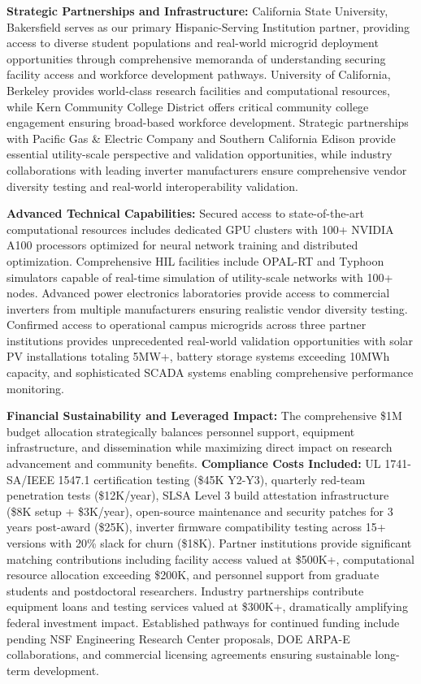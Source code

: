\documentclass[12pt]{article}
\begin{document}
\textbf{Strategic Partnerships and Infrastructure:} California State University, Bakersfield serves as our primary Hispanic-Serving Institution partner, providing access to diverse student populations and real-world microgrid deployment opportunities through comprehensive memoranda of understanding securing facility access and workforce development pathways. University of California, Berkeley provides world-class research facilities and computational resources, while Kern Community College District offers critical community college engagement ensuring broad-based workforce development. Strategic partnerships with Pacific Gas \& Electric Company and Southern California Edison provide essential utility-scale perspective and validation opportunities, while industry collaborations with leading inverter manufacturers ensure comprehensive vendor diversity testing and real-world interoperability validation.

\textbf{Advanced Technical Capabilities:} Secured access to state-of-the-art computational resources includes dedicated GPU clusters with 100+ NVIDIA A100 processors optimized for neural network training and distributed optimization. Comprehensive HIL facilities include OPAL-RT and Typhoon simulators capable of real-time simulation of utility-scale networks with 100+ nodes. Advanced power electronics laboratories provide access to commercial inverters from multiple manufacturers ensuring realistic vendor diversity testing. Confirmed access to operational campus microgrids across three partner institutions provides unprecedented real-world validation opportunities with solar PV installations totaling 5MW+, battery storage systems exceeding 10MWh capacity, and sophisticated SCADA systems enabling comprehensive performance monitoring.

\textbf{Financial Sustainability and Leveraged Impact:} The comprehensive \$1M budget allocation \cite{nrel2021} strategically balances personnel support, equipment infrastructure, and dissemination while maximizing direct impact on research advancement and community benefits. \textbf{Compliance Costs Included:} UL 1741-SA/IEEE 1547.1 certification testing (\$45K Y2-Y3), quarterly red-team penetration tests (\$12K/year), SLSA Level 3 build attestation infrastructure (\$8K setup + \$3K/year), open-source maintenance and security patches for 3 years post-award (\$25K), inverter firmware compatibility testing across 15+ versions with 20\% slack for churn (\$18K). Partner institutions provide significant matching contributions including facility access valued at \$500K+, computational resource allocation exceeding \$200K, and personnel support from graduate students and postdoctoral researchers. Industry partnerships contribute equipment loans and testing services valued at \$300K+, dramatically amplifying federal investment impact. Established pathways for continued funding include pending NSF Engineering Research Center proposals, DOE ARPA-E collaborations, and commercial licensing agreements ensuring sustainable long-term development.
\end{document}
